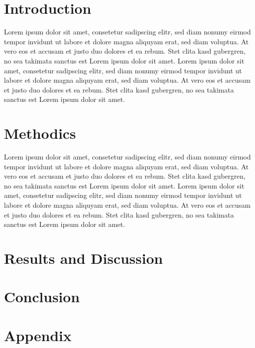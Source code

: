 \documentclass[10pt]{article}
\begin{document}
\section*{Introduction}
 Lorem ipsum dolor sit amet, consetetur sadipscing elitr, sed diam nonumy eirmod tempor invidunt ut labore et dolore magna aliquyam erat, sed diam voluptua. At vero eos et accusam et justo duo dolores et ea rebum. Stet clita kasd gubergren, no sea takimata sanctus est Lorem ipsum dolor sit amet. Lorem ipsum dolor sit amet, consetetur sadipscing elitr, sed diam nonumy eirmod tempor invidunt ut labore et dolore magna aliquyam erat, sed diam voluptua. At vero eos et accusam et justo duo dolores et ea rebum. Stet clita kasd gubergren, no sea takimata sanctus est Lorem ipsum dolor sit amet.  

	
\section*{Methodics}

  Lorem ipsum dolor sit amet, consetetur sadipscing elitr, sed diam nonumy eirmod tempor invidunt ut labore et dolore magna aliquyam erat, sed diam voluptua. At vero eos et accusam et justo duo dolores et ea rebum. Stet clita kasd gubergren, no sea takimata sanctus est Lorem ipsum dolor sit amet. Lorem ipsum dolor sit amet, consetetur sadipscing elitr, sed diam nonumy eirmod tempor invidunt ut labore et dolore magna aliquyam erat, sed diam voluptua. At vero eos et accusam et justo duo dolores et ea rebum. Stet clita kasd gubergren, no sea takimata sanctus est Lorem ipsum dolor sit amet.  
 
 
\section*{Results and Discussion}


\section*{Conclusion}

\renewcommand\refname{Bibliography}
	
	 


\section*{Appendix}
\end{document}
